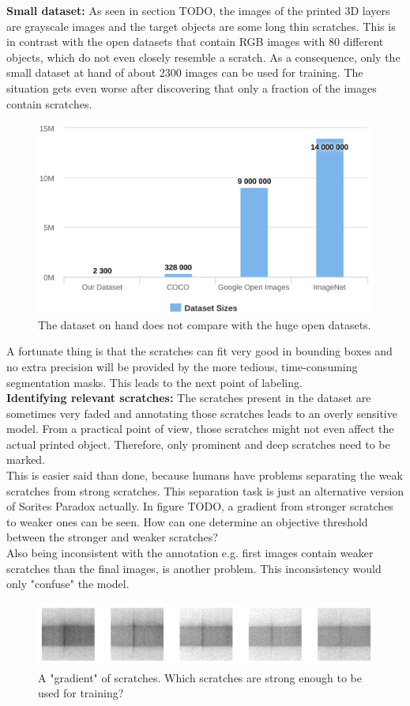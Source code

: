 \textbf{Small dataset:}
As seen in section TODO, the images of the printed 3D layers are grayscale images and the target objects are some long thin scratches. This is in contrast with the open datasets that contain RGB images with 80 different objects, which do not even closely resemble a scratch. As a consequence, only the small dataset at hand of about 2300 images can be used for training. The situation gets even worse after discovering that only a fraction of the images contain scratches. \\
\begin{figure}[!h]
\centering
\includegraphics[width=0.4\columnwidth]{images/introduction/dataset_sizes}
\caption{The dataset on hand does not compare with the huge open datasets.}
\label{intro:dataset_sizes}
\end{figure}
A fortunate thing is that the scratches can fit very good in bounding boxes and no extra precision will be provided by the more tedious, time-consuming segmentation masks. This leads to the next point of labeling. \\



\textbf{Identifying relevant scratches:}
The scratches present in the dataset are sometimes very faded and annotating those scratches leads to an overly sensitive model. From a practical point of view, those scratches might not even affect the actual printed object. Therefore, only prominent and deep scratches need to be marked. \\
This is easier said than done, because humans have problems separating the weak scratches from strong scratches. This separation task is just an alternative version of Sorites Paradox actually. In figure TODO, a gradient from stronger scratches to weaker ones can be seen. How can one determine an objective threshold between the stronger and weaker scratches? \\
Also being inconsistent with the annotation e.g. first images contain weaker scratches than the final images, is another problem. This inconsistency would only "confuse" the model.

\begin{figure}[!h]
\centering
\captionsetup{justification=centering,margin=2cm}
\includegraphics[width=\columnwidth]{images/introduction/original_scratch_fades}
\caption{A "gradient" of scratches. Which scratches are strong enough to be used for training?}
\label{intro:original_scratch_fades}
\end{figure}


